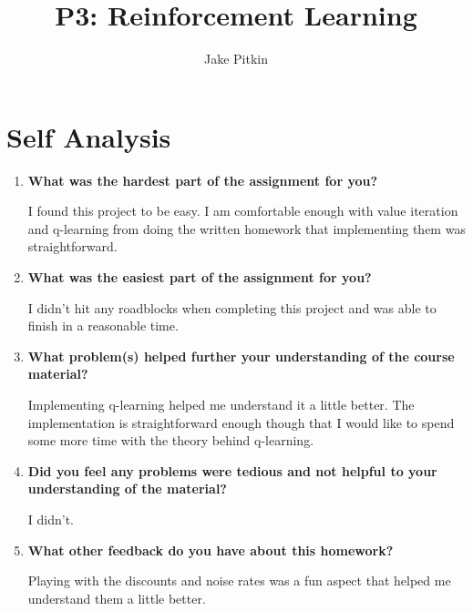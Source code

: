 \documentclass[fleqn]{hw}
\title{P3: Reinforcement Learning}
\institute{University of Utah}
\author{Jake Pitkin}
\begin{document}
\maketitle

\section*{Self Analysis}

\begin{enumerate}
	\item \textbf{What was the hardest part of the assignment for you?}
	
I found this project to be easy. I am comfortable enough with value iteration and q-learning from doing the written homework that implementing them was straightforward.
	\item \textbf{What was the easiest part of the assignment for you?}
	
I didn't hit any roadblocks when completing this project and was able to finish in a reasonable time.
	\item \textbf{What problem(s) helped further your understanding of the course material?}

Implementing q-learning helped me understand it a little better. The implementation is straightforward enough though that I would like to spend some more time with the theory behind q-learning.
	\item \textbf{Did you feel any problems were tedious and not helpful to your understanding of the
material?}

I didn't.
	\item \textbf{What other feedback do you have about this homework?}

Playing with the discounts and noise rates was a fun aspect that helped me understand them a little better.
\end{enumerate}
\end{document}
